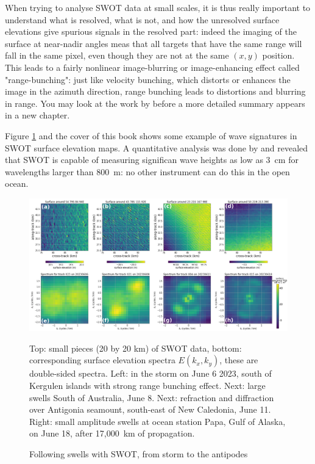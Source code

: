 When trying to analyse SWOT data at small scales, it is thus really important to understand what is resolved, what is not, and how the unresolved surface elevations give spurious signals in the resolved part: indeed the imaging of the surface at near-nadir angles meas that all targets that have the same range will fall in the same pixel, even though they are not at the same $(x,y)$ position. This leads to a fairly nonlinear image-blurring or image-enhancing effect called "range-bunching": just like velocity bunching, which distorts or enhances the image in the azimuth direction, range bunching leads to distortions and blurring in range. You may look at the work by \cite{Peral&al.2015} before a more detailed summary appears in a new chapter. 

Figure \ref{fig:SWOTswell} and the cover of this book shows some example of wave signatures in SWOT surface elevation maps. A quantitative analysis was done by \cite{Ardhuin&al.2024} and revealed that SWOT is capable of measuring significan wave heights as low as 3~cm for wavelengths larger than 800~m: no other instrument can do this in the open ocean.
\begin{figure}[htb]
\centerline{\includegraphics[width=\textwidth]{FIGS_CH_SAT/SWOTSWELL.pdf}}
\caption{Following swells with SWOT, from storm to the antipodes}{Top: small pieces (20 by 20 km) of SWOT data, bottom: corresponding surface elevation spectra $E(k_x,k_y)$, these are double-sided spectra. Left: in the storm on June 6 2023, south of Kergulen islands with strong range bunching effect. Next: large swells South of Australia, June 8. Next: refraction and diffraction over Antigonia seamount, south-east of New Caledonia, June 11. Right: small amplitude swells at ocean station Papa, Gulf of Alaska, on June 18, after 17,000~km of propagation.}
\label{fig:SWOTswell}
\end{figure}


